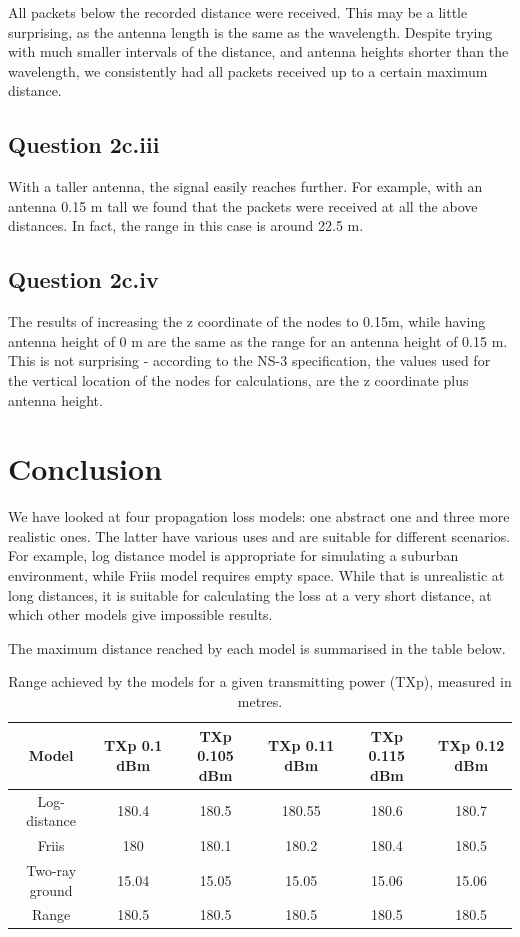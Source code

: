 \documentclass[11pt,journal]{article}
\begin{document}
	All packets below the recorded distance were received. This may be a little surprising, as the antenna length is the same as the wavelength. Despite trying with much smaller intervals of the distance, and antenna heights shorter than the wavelength, we consistently had all packets received up to a certain maximum distance.

	\subsection{Question 2c.iii}
	With a taller antenna, the signal easily reaches further. For example, with an antenna 0.15 m tall we found that the packets were received at all the above distances. In fact, the range in this case is around 22.5 m.
	
	\subsection{Question 2c.iv}
	The results of increasing the z coordinate of the nodes to 0.15m, while having antenna height of 0 m are the same as the range for an antenna height of 0.15 m. This is not surprising - according to the NS-3 specification, the values used for the vertical location of the nodes for calculations, are the z coordinate plus antenna height.
	
	\section{Conclusion}
	
	We have looked at four propagation loss models: one abstract one and three more realistic ones. The latter have various uses and are suitable for different scenarios. For example, log distance model is appropriate for simulating a suburban environment, while Friis model requires empty space. While that is unrealistic at long distances, it is suitable for calculating the loss at a very short distance, at which other models give impossible results.
	
	The maximum distance reached by each model is summarised in the table below.
	
	\begin{table}[h]
		\centering
		\begin{tabular}{|c|c|c|c|c|c|}
			\hline
			Model& TXp 0.1 dBm & TXp 0.105 dBm & TXp 0.11 dBm & TXp 0.115 dBm & TXp 0.12 dBm \\
			\hline
			Log-distance & 180.4 & 180.5 & 180.55 & 180.6 & 180.7 \\
			\hline
			Friis & 180 & 180.1 & 180.2 & 180.4 & 180.5 \\
			\hline 
			Two-ray ground & 15.04 & 15.05 & 15.05 & 15.06 & 15.06 \\
			\hline
			Range &180.5 &180.5 & 180.5 & 180.5 & 180.5\\
			\hline
		\end{tabular}
	\caption{Range achieved by the models for a given transmitting power (TXp), measured in metres.}
	\end{table}
	\pagebreak	
	
\end{document}
